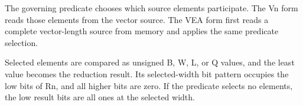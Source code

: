 The governing predicate chooses which source elements participate. The Vn form
reads those elements from the vector source. The VEA form first reads a complete
vector-length source from memory and applies the same predicate selection.

Selected elements are compared as unsigned B, W, L, or Q values, and the least
value becomes the reduction result. Its selected-width bit pattern occupies the
low bits of Rn, and all higher bits are zero. If the predicate selects no
elements, the low result bits are all ones at the selected width.
